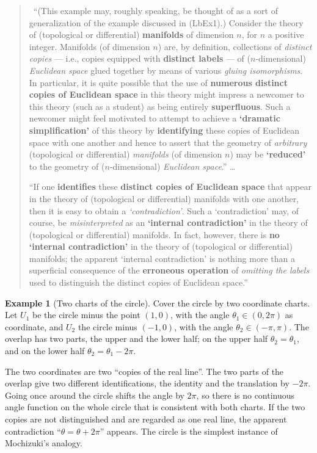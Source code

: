 \documentclass[11pt,a4paper]{article}
\newcommand{\lab}[2]{{\upshape\fcolorbox{#1}{#1!8}{\scriptsize\sffamily\bfseries\textcolor{#1}{#2}}}}
\newcommand{\tagS}{\lab{blue}{S}}
\newcommand{\q}[1]{``#1''}
\newcommand{\srcquote}[2]{\begin{quote}\small\tagS\ #1\par\nopagebreak\hfill{\footnotesize #2}\end{quote}}
\theoremstyle{plain}
\theoremstyle{definition}
\newtheorem{example}[theorem]{Example}
\theoremstyle{remark}
\begin{document}
\srcquote{\q{(This example may, roughly speaking, be thought of as a sort of generalization of the example discussed in
(LbEx1).) Consider the theory of (topological or differential) \textbf{manifolds} of dimension $n$, for $n$ a positive
integer. Manifolds (of dimension $n$) are, by definition, collections of \emph{distinct copies} --- i.e., copies equipped
with \textbf{distinct labels} --- of ($n$-dimensional) \emph{Euclidean space} glued together by means of various
\emph{gluing isomorphisms}. In particular, it is quite possible that the use of \textbf{numerous distinct copies of
Euclidean space} in this theory might impress a newcomer to this theory (such as a student) as being entirely
\textbf{superfluous}. Such a newcomer might feel motivated to attempt to achieve a \textbf{`dramatic simplification'} of
this theory by \textbf{identifying} these copies of Euclidean space with one another and hence to assert that the
geometry of \emph{arbitrary} (topological or differential) \emph{manifolds} (of dimension $n$) may be
\textbf{`reduced'} to the geometry of ($n$-dimensional) \emph{Euclidean space}.} \dots\par
\q{If one \textbf{identifies} these \textbf{distinct copies of Euclidean space} that appear in the theory of (topological or
differential) manifolds with one another, then it is easy to obtain a \emph{`contradiction'}. Such a `contradiction' may,
of course, be \emph{misinterpreted} as an \textbf{`internal contradiction'} in the theory of (topological or
differential) manifolds. In fact, however, there is \textbf{no `internal contradiction'} in the theory of (topological or
differential) manifolds; the apparent `internal contradiction' is nothing more than a superficial consequence of the
\textbf{erroneous operation} of \emph{omitting the labels} used to distinguish the distinct copies of Euclidean
space.}}{\cite[\S14, (LbEx5)]{R18}}

\begin{example}[Two charts of the circle]
Cover the circle by two coordinate charts. Let $U_1$ be the circle minus the point $(1,0)$, with the angle
$\theta_1\in(0,2\pi)$ as coordinate, and $U_2$ the circle minus $(-1,0)$, with the angle $\theta_2\in(-\pi,\pi)$. The
overlap has two parts, the upper and the lower half; on the upper half $\theta_2=\theta_1$, and on the lower half
$\theta_2=\theta_1-2\pi$.
\end{example}
The two coordinates are two ``copies of the real line''. The two parts of the overlap give two different identifications,
the identity and the translation by $-2\pi$. Going once around the circle shifts the angle by $2\pi$, so there is no
continuous angle function on the whole circle that is consistent with both charts. If the two copies are not
distinguished and are regarded as one real line, the apparent contradiction ``$\theta=\theta+2\pi$'' appears. The circle
is the simplest instance of Mochizuki's analogy.
\end{document}
